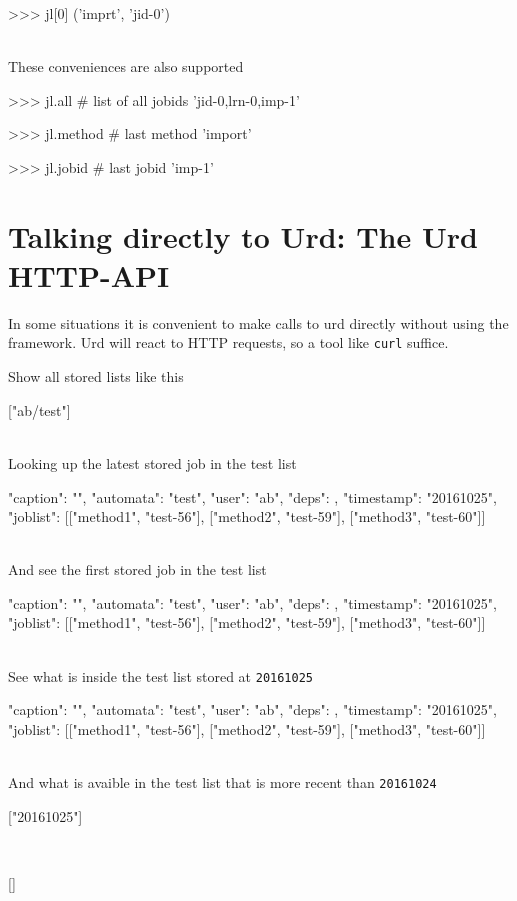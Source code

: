 \begin{pythonMID}
>>> jl[0]
('imprt', 'jid-0')
\end{pythonMID}
\\
These conveniences are also supported

\begin{pythonEND}
>>> jl.all              # list of all jobids
'jid-0,lrn-0,imp-1'

>>> jl.method           # last method
'import'

>>> jl.jobid            # last jobid
'imp-1'
\end{pythonEND}



\newpage
\section{Talking directly to Urd:  The Urd HTTP-API}

In some situations it is convenient to make calls to urd directly
without using the framework.  Urd will react to HTTP requests, so a
tool like \texttt{curl} suffice.

\noindent Show all stored lists like this\\
\begin{shell}
["ab/test"]
\end{shell}
\\
Looking up the latest stored job in the test list\\
\begin{shell}
{"caption": "", "automata": "test", "user": "ab", "deps": {},
  "timestamp": "20161025", "joblist": [["method1", "test-56"],
  ["method2", "test-59"], ["method3", "test-60"]]}
\end{shell}
\\
And see the first stored job in the test list\\
\begin{shell}
{"caption": "", "automata": "test", "user": "ab", "deps": {},
  "timestamp": "20161025", "joblist": [["method1", "test-56"],
  ["method2", "test-59"], ["method3", "test-60"]]}
\end{shell}
\\
See what is inside the test list stored at \texttt{20161025}\\
\begin{shell}
{"caption": "", "automata": "test", "user": "ab", "deps": {},
  "timestamp": "20161025", "joblist": [["method1", "test-56"],
  ["method2", "test-59"], ["method3", "test-60"]]}
\end{shell}
\\
And what is avaible in the test list that is more recent than \texttt{20161024}\\
\begin{shell}
["20161025"]
\end{shell}
\\
\begin{shell}
[]
\end{shell}
